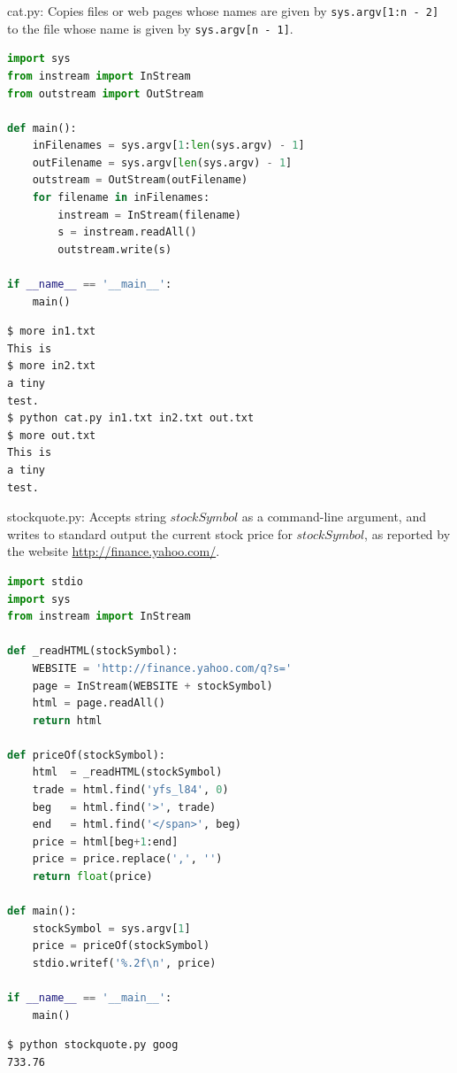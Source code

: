 \documentclass[8pt,a4paper,compress,handout]{beamer}
\begin{document}
\begin{frame}[fragile]
\begin{framed}
\tiny cat.py: Copies files or web pages whose names are given by \lstinline{sys.argv[1:n - 2]} to the file whose name is given by \lstinline{sys.argv[n - 1]}.
\end{framed}

\begin{lstlisting}[language=Python]
import sys
from instream import InStream
from outstream import OutStream

def main():
    inFilenames = sys.argv[1:len(sys.argv) - 1]
    outFilename = sys.argv[len(sys.argv) - 1]
    outstream = OutStream(outFilename)
    for filename in inFilenames:
        instream = InStream(filename)
        s = instream.readAll()
        outstream.write(s)

if __name__ == '__main__':
    main()
\end{lstlisting}

\begin{lstlisting}[language={}]
$ more in1.txt
This is
$ more in2.txt
a tiny
test.
$ python cat.py in1.txt in2.txt out.txt
$ more out.txt
This is
a tiny
test.
\end{lstlisting}
\end{frame}

\begin{frame}[fragile]
\begin{framed}
\tiny stockquote.py: Accepts string $stockSymbol$ as a command-line argument, and writes to standard output the current stock price for $stockSymbol$, as reported by the website \href{http://finance.yahoo.com/}{http://finance.yahoo.com/}.
\end{framed}

\begin{lstlisting}[language=Python]
import stdio
import sys
from instream import InStream

def _readHTML(stockSymbol):
    WEBSITE = 'http://finance.yahoo.com/q?s='
    page = InStream(WEBSITE + stockSymbol)
    html = page.readAll()
    return html

def priceOf(stockSymbol):
    html  = _readHTML(stockSymbol)
    trade = html.find('yfs_l84', 0)
    beg   = html.find('>', trade)
    end   = html.find('</span>', beg)
    price = html[beg+1:end]
    price = price.replace(',', '')
    return float(price)

def main():
    stockSymbol = sys.argv[1]
    price = priceOf(stockSymbol)
    stdio.writef('%.2f\n', price)

if __name__ == '__main__':
    main()
\end{lstlisting}

\begin{lstlisting}[language={}]
$ python stockquote.py goog
733.76
\end{lstlisting}
\end{frame}
\end{document}
